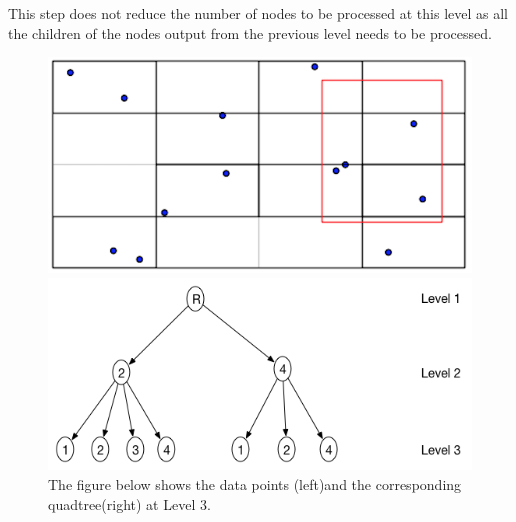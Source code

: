 \documentclass{article}
\begin{document}
This step does not reduce the number of nodes to be processed at this level as all the children of the nodes output from the previous level needs to be processed.
\begin{figure}[H]
  \centering
  \begin{minipage}[b]{0.35\textwidth}
    \includegraphics[width=\textwidth]{2Quad_3}  
  \end{minipage}
  \hfill
  \begin{minipage}[b]{0.6\textwidth}
    \includegraphics[width=\textwidth]{2Quad_3_tree}
  \end{minipage}
  \caption{The figure below shows the data points (left)and the corresponding quadtree(right) at Level 3.}
\end{figure}

\vspace{2cm}
\end{document}
